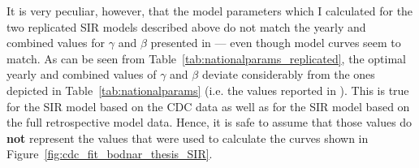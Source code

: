 \documentclass[11pt, a4paper,twoside]{report}\usepackage[]{graphicx}\usepackage[]{color}
\begin{document}
It is very peculiar, however, that the model parameters which I calculated for the two replicated SIR models described above do not match the yearly and combined values for $\gamma$ and $\beta$ presented in \citep{bodnar_data_2015} --- even though model curves seem to match. As can be seen from Table~\ref{tab:nationalparams_replicated}, the optimal yearly and combined values of $\gamma$ and $\beta$ deviate considerably from the ones depicted in Table~\ref{tab:nationalparams} (i.e. the values reported in \citep{bodnar_data_2015}). This is true for the SIR model based on the CDC data as well as for the SIR model based on the full retrospective model data. Hence, it is safe to assume that those values do \textbf{not} represent the values that were used to calculate the curves shown in Figure~\ref{fig:cdc_fit_bodnar_thesis_SIR}.\newpage
\end{document}
